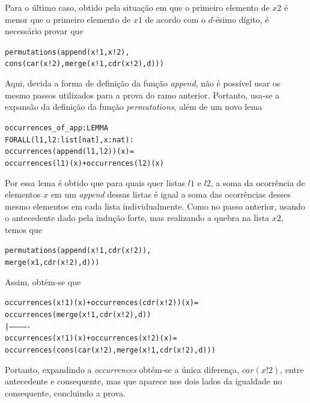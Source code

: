 \documentclass[a4paper, 12pt]{article}
\begin{document}
    Para o último caso, obtido pela situação em que o primeiro elemento de $x2$ é menor que o primeiro elemento de $x1$ de acordo com o $d$-ésimo dígito, é necessário provar que 
    \begin{alltt}
    permutations(append(x!1, x!2),
        cons(car(x!2), merge(x!1, cdr(x!2), d)))
    \end{alltt}
    Aqui, devida a forma de definição da função \textit{append}, não é possível usar os mesmo passos utilizados para a prova do ramo anterior. Portanto, usa-se a expansão da definição da função \textit{permutations}, além de um novo lema
    \begin{alltt}
    occurrences_of_app : LEMMA
        FORALL (l1,l2:list[nat], x : nat) : 
            occurrences(append(l1, l2))(x) =
            occurrences(l1)(x) + occurrences(l2)(x)
    \end{alltt}
    Por essa lema é obtido que para quais quer listas $l1$ e $l2$, a soma da ocorrência de elementos $x$ em um \textit{append} dessas listas é igual a soma das ocorrências desses mesmo elementos em cada lista individualmente. Como no passo anterior, usando o antecedente dado pela indução forte, mas realizando a quebra na lista $x2$, temos que 
    \begin{alltt}
    permutations(append(x!1, cdr(x!2)), 
        merge(x1, cdr(x!2), d)))
    \end{alltt}
    Assim, obtém-se que 
    \begin{alltt}
    occurrences(x!1)(x) + occurrences(cdr(x!2))(x) = 
        occurrences(merge(x!1, cdr(x!2), d))
    |-------------
    occurrences(x!1)(x) + occurrences(x!2)(x) = 
        occurrences(cons(car(x!2), merge(x!1, cdr(x!2), d)))
    \end{alltt}
    Portanto, expandindo a \textit{occurrences} obtém-se a única diferença, $car(x!2)$, entre antecedente e consequente, mas que aparece nos dois lados da igualdade no consequente, concluindo a prova.
\end{document}
